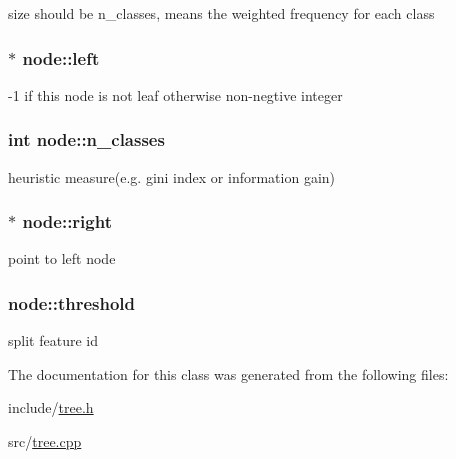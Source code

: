 size should be {\ttfamily n\+\_\+classes}, means the weighted frequency for each class \hypertarget{classnode_a7cbff55ff448f557223f79299056e9b1}{
\subsubsection[{left}]{$\ast$ node\+::left}}\label{classnode_a7cbff55ff448f557223f79299056e9b1}
-\/1 if this node is not leaf otherwise non-\/negtive integer \hypertarget{classnode_a8c4864582cb3fe15e84e7908d0965150}{
\subsubsection[{n\+\_\+classes}]{\setlength{\rightskip}{0pt plus 5cm}int node\+::n\+\_\+classes}}\label{classnode_a8c4864582cb3fe15e84e7908d0965150}
heuristic measure(e.\+g. gini index or information gain) \hypertarget{classnode_abdc86d4c8604c481752953af3235fc47}{
\subsubsection[{right}]{$\ast$ node\+::right}}\label{classnode_abdc86d4c8604c481752953af3235fc47}
point to left node \hypertarget{classnode_a3774a77cb58d1554f63f34cbcb737a0c}{
\subsubsection[{threshold}]{ node\+::threshold}}\label{classnode_a3774a77cb58d1554f63f34cbcb737a0c}
split feature id 

The documentation for this class was generated from the following files\+:\begin{DoxyCompactItemize}
\item 
include/\hyperlink{tree_8h}{tree.\+h}\item 
src/\hyperlink{tree_8cpp}{tree.\+cpp}\end{DoxyCompactItemize}
